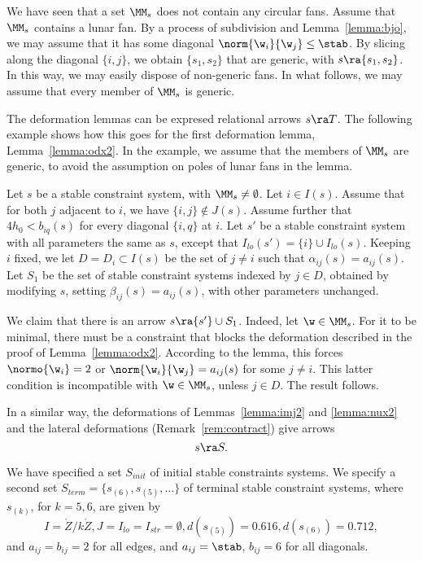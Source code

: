 \begin{remark}
We have seen that a set $\MM_s$ does not contain any circular fans.
Assume that $\MM_s$ contains a lunar fan.
By a process of subdivision and Lemma~\ref{lemma:bjo}, we may assume
that it has some diagonal $\norm{\w_i}{\w_j}\le\stab$.  By slicing
along
the diagonal $\{i,j\}$, we obtain $\{s_1,s_2\}$ that are generic, with
$s\ra\{s_1,s_2\}$.  In this way, we may easily dispose of non-generic
fans.  In what follows, we may assume that every member of $\MM_s$ is
generic.
\end{remark}

The deformation lemmas can be expresed relational
arrows $s\ra T$.  The following example shows how this goes
for the first deformation lemma, Lemma~\ref{lemma:odx2}.  
In the example, we assume
that the members of $\MM_s$ are generic, to avoid the assumption
on poles of lunar fans in the lemma.

\begin{example}[deformation]  
Let $s$ be a stable constraint
  system, with $\MM_s\ne\emptyset$.  Let $i\in I(s)$.
Assume that for both $j$ adjacent to $i$, we have $\{i,j\}\not\in
J(s)$.
Assume further that $4h_0 < b_{iq}(s)$ for every diagonal $\{i,q\}$ at
$i$.  Let $s'$ be a stable constraint system with all parameters
the same as $s$, except that $I_{lo}(s') = \{i\}\cup I_{lo}(s)$.
Keeping $i$ fixed, we
let $D=D_i\subset I(s)$ be the set of $j\ne i$ such that 
$\alpha_{ij}(s)=a_{ij}(s)$. 
Let $S_1$ be the set of stable constraint systems indexed by $j\in
D$,
obtained by
modifying $s$, setting $\beta_{ij}(s)=a_{ij}(s)$, with other
parameters unchanged.

We claim that there is an arrow $s\ra \{s'\}\cup S_1$.  Indeed, let
$\w\in \MM_s$.  For it to be minimal, there must be a constraint
that blocks the  deformation described in the proof of
Lemma~\ref{lemma:odx2}.
According to the lemma, this forces $\normo{\w_i}=2$ or
$\norm{\w_i}{\w_j}=a_{ij}(s)$ for some $j\ne i$.  This latter
condition
is incompatible with $\w\in \MM_s$, unless $j\in D$.  The result
follows.
\end{example}


In a similar way, the deformations of Lemmas~\ref{lemma:imj2} and \ref{lemma:nux2} and
the lateral deformations (Remark~\ref{rem:contract}) give arrows
\[
s\ra S.
\]

We have specified a set $S_{init}$ of initial stable constraints systems.
We specify a second set $S_{term}=\{s_{(6)},s_{(5)},\ldots\}$ 
of terminal stable constraint systems, where
 $s_{(k)}$, for $k=5,6$,  are given by
\[
I=\ring{Z}/k\ring{Z}, J=I_{lo}=I_{str}=\emptyset, d(s_{(5)})=0.616, d(s_{(6)})=0.712,
\]
and $a_{ij}=b_{ij}=2$ for all edges, 
and $a_{ij}=\stab$, $b_{ij}=6$ for all diagonals.

